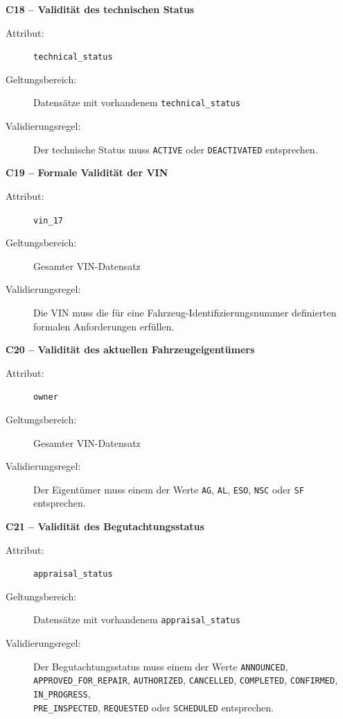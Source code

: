 \documentclass[../main.tex]{subfiles}
\begin{document}
\medskip 
\noindent\textbf{C18 -- Validität des technischen Status} 
\begin{description} 
    \item[Attribut:] \texttt{technical\_status} 
    \item[Geltungsbereich:] Datensätze mit vorhandenem \texttt{technical\_status} 
    \item[Validierungsregel:] Der technische Status muss \texttt{ACTIVE} oder \texttt{DEACTIVATED} entsprechen. 
\end{description} 

\medskip 
\noindent\textbf{C19 -- Formale Validität der VIN} 
\begin{description} 
    \item[Attribut:] \texttt{vin\_17}
    \item[Geltungsbereich:] Gesamter VIN-Datensatz 
    \item[Validierungsregel:] Die VIN muss die für eine Fahrzeug-Identifizierungsnummer definierten formalen Anforderungen erfüllen. 
\end{description} 

\medskip 
\noindent\textbf{C20 -- Validität des aktuellen Fahrzeugeigentümers} 
\begin{description} 
    \item[Attribut:] \texttt{owner} 
    \item[Geltungsbereich:] Gesamter VIN-Datensatz 
    \item[Validierungsregel:] Der Eigentümer muss einem der Werte \texttt{AG}, \texttt{AL}, \texttt{ESO}, \texttt{NSC} oder \texttt{SF} entsprechen. 
\end{description} 

\medskip 
\noindent\textbf{C21 -- Validität des Begutachtungsstatus} 
\begin{description} 
    \item[Attribut:] \texttt{appraisal\_status} 
    \item[Geltungsbereich:] Datensätze mit vorhandenem \texttt{appraisal\_status} 
    \item[Validierungsregel:] Der Begutachtungsstatus muss einem der Werte \texttt{ANNOUNCED},  \\ \texttt{APPROVED\_FOR\_REPAIR}, \texttt{AUTHORIZED}, \texttt{CANCELLED}, \texttt{COMPLETED}, \texttt{CONFIRMED}, \texttt{IN\_PROGRESS}, \\ \texttt{PRE\_INSPECTED}, \texttt{REQUESTED} oder \texttt{SCHEDULED} entsprechen. 
\end{description} 
\end{document}
